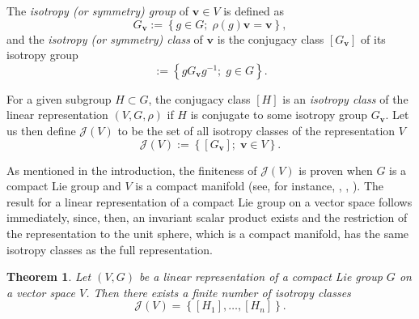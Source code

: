 \documentclass[11pt,a4paper]{amsart}
\newtheorem{thm}{Theorem}[section]
\theoremstyle{definition}
\newcommand{\J}{\mathcal{J}}                %
\newcommand{\1}{\mathds{1}}		            %
\newcommand{\vv}{\pmb{v}}                   %
\newcommand{\set}[1]{\left\{#1\right\}}     %
\begin{document}
The \emph{isotropy (or symmetry) group} of $\vv\in V$ is defined as
\begin{equation*}
  G_{\vv} := \set{g\in G; \; \rho(g)\vv=\vv},
\end{equation*}
and the \emph{isotropy (or symmetry) class} of $\vv$ is the conjugacy class $[G_{\vv}]$ of its isotropy group
\begin{equation*}
  [G_{\vv}] := \set{gG_{\vv}g^{-1};\; g\in G}.
\end{equation*}

For a given subgroup $H\subset G$, the conjugacy class $[H]$ is an \emph{isotropy class} of the linear representation $(V,G,\rho)$ if $H$ is conjugate to some isotropy group $G_{\vv}$. Let us then define $\J(V)$ to be the set of all isotropy classes of the representation $V$
\begin{equation*}
  \J(V) := \set{[G_{\vv}];\; \vv\in V}.
\end{equation*}

As mentioned in the introduction, the finiteness of $\J(V)$ is proven when $G$ is a compact Lie group and $V$ is a compact manifold (see, for instance, \cite{Mostow1957}, \cite{Bredon1960}, \cite{Mann1962}). The result for a linear representation of a compact Lie group on a vector space follows immediately, since, then, an invariant scalar product exists and the restriction of the representation to the unit sphere, which is a compact manifold, has the same isotropy classes as the full representation.

\begin{thm}
  Let $(V,G)$ be a linear representation of a compact Lie group $G$ on a vector space $V$. Then there exists a finite number of isotropy classes
  \begin{equation*}
    \J(V)=\set{[H_1],\dotsc, [H_n]}.
  \end{equation*}
\end{thm}
\end{document}
